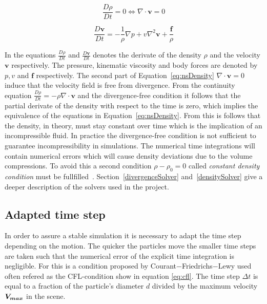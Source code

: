     \begin{equation} \label{eq:nsDensity}
        \frac{D\rho}{Dt} = 0 \Leftrightarrow \nabla \cdot \textbf{v} = 0 
    \end{equation}

    \begin{equation} \label{eq:nsVelocity}
        \frac{D\textbf{v}}{Dt} = -\frac{1}{\rho} \nabla p + v \nabla ^2 \textbf{v} + \frac{\textbf{f}}{\rho}
    \end{equation}

    In the equations $\frac{D\rho}{Dt}$ and $\frac{D\textbf{v}}{Dt}$ denotes the derivate of the density $\rho$ and the velocity $\textbf{v}$ respectively. The pressure, kinematic viscosity and body forces are denoted by $p,v$ and $\textbf{f}$ respectively. The second part of Equation~\ref{eq:nsDensity} $\nabla \cdot \textbf{v} = 0$ induce that the velocity field is free from divergence. From the continuity equation $\frac{D\rho}{Dt} = -\rho \nabla \cdot \textbf{v}$ and the divergence-free condition it follows that the partial derivate of the density with respect to the time is zero, which implies the equivalence of the equations in Equation~\ref{eq:nsDensity}. From this is follows that the density, in theory, must stay constant over time which is the implication of an incompressible fluid. In practice the divergence-free condition is not sufficient to guarantee incompressibility in simulations. The numerical time integrations will contain numerical errors which will cause density deviations due to the volume compressions. To avoid this a second condition $\rho - \rho_0 = 0$ called \textit{constant density condition} must be fullfilled~\cite{bender}. Section~\ref{divergenceSolver} and~\ref{densitySolver} give a deeper description of the solvers used in the project.


\subsection{Adapted time step} \label{section:timestep}

In order to assure a stable simulation it is necessary to adapt the time step depending on the motion. 
The quicker the particles move the smaller time steps are taken such that the numerical 
error of the explicit time integration is negligible. For this is a condition proposed by 
Courant$-$Friedrichs$-$Lewy used often refered as the CFL-condition show in equation \ref{eq:cfl}. 
The time step $\Delta t$ is equal to a fraction of the particle's diameter $d$ divided by 
the maximum velocity $\bm{V_{max}}$ in the scene.

